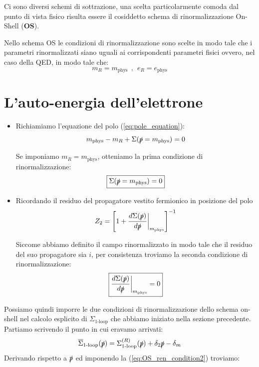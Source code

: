 \documentclass[../main.tex]{subfiles}
\begin{document}
Ci sono diversi schemi di sottrazione, una scelta particolarmente comoda dal punto di vista fisico risulta essere il cosiddetto schema di rinormalizzazione On-Shell (\textbf{OS}).

Nello schema OS le condizioni di rinormalizzazione sono scelte in modo tale che i parametri rinormalizzati siano uguali ai corrispondenti parametri fisici ovvero, nel caso della QED, in modo tale che:
\begin{equation}
    \boxed{m_R = m_\text{phys} ~~,~~ e_R = e_\text{phys}}
    \label{eq:OS_phys_conditions}
\end{equation}


\section{L'auto-energia dell'elettrone}
\begin{itemize}
    \item[\blacksquare] Richiamiamo l'equazione del polo (\ref{eq:pole_equation}):
    \[
    m_\text{phys} - m_R + \Sigma(\slashed p = m_\text{phys}) = 0
    \]
    
    Se imponiamo $m_R = m_\text{phys}$, otteniamo la prima condizione di rinormalizzazione:
    \begin{equation}
        \boxed{
        \Sigma(\slashed p = m_\text{phys}) = 0
        }
        \label{eq:OS_ren_condition1}
    \end{equation}
    \item[\blacksquare] Ricordando il residuo del propagatore vestito fermionico in posizione del polo
    \[
    Z_2 = \Biggl[1 + \frac{d\Sigma(\slashed p)}{d\slashed p}\bigg|_{ m_\text{phys}}\Biggl]^{-1}
    \]

    Siccome abbiamo definito il campo rinormalizzato in modo tale che il residuo del suo propagatore sia $i$, per consistenza troviamo la seconda condizione di rinormalizzazione:
    \begin{equation}
        \boxed{
        \frac{d\Sigma(\slashed p)}{d\slashed p}\bigg|_{ m_\text{phys}} = 0
        }
        \label{eq:OS_ren_condition2}
    \end{equation}
\end{itemize}
Possiamo quindi imporre le due condizioni di rinormalizzazione dello schema on-shell nel calcolo esplicito di $\Sigma_\text{1-loop}$ che abbiamo iniziato nella sezione precedente. Partiamo scrivendo il punto in cui eravamo arrivati:
\begin{equation}
     \overline\Sigma_\text{1-loop}(\slashed p) = {\Sigma_\text{1-loop}^{(R)}(\slashed p)} + \delta_2\slashed p - \delta_m
    \label{eq:decomposed_sigma_1loop}
\end{equation}
Derivando rispetto a $\slashed p$ ed imponendo la (\ref{eq:OS_ren_condition2}) troviamo:
\end{document}
